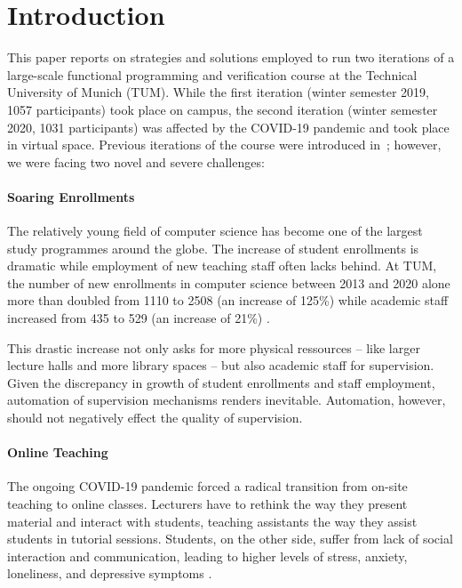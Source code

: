 \section{Introduction}

This paper reports on strategies and solutions employed to
run two iterations of a large-scale functional programming and verification course at the Technical University of Munich (TUM).
While the first iteration (winter semester 2019, 1057  participants)
took place on campus,
the second iteration (winter semester 2020, 1031 participants) was affected by the COVID-19 pandemic and took place in virtual space.
Previous iterations of the course were introduced in~\citep{next_1100};
however, we were facing two novel and severe challenges:

\paragraph{Soaring Enrollments}
The relatively young field of computer science has
become one of the largest study programmes around the globe.
The increase of student enrollments is dramatic
\citep{comp_sci_growth1,comp_sci_growth2}
while employment of new teaching staff often lacks behind.
At TUM, the number of new enrollments in computer science between 2013 and 2020 alone
more than doubled from 1110 to 2508 (an increase of 125\%)
while academic staff increased from 435 to 529 (an increase of 21\%) \citep{tum_numbers}.

This drastic increase not only asks for more physical ressources -- like larger lecture halls and more library spaces --
but also academic staff for supervision.
Given the discrepancy in growth of student enrollments and staff employment,
automation of supervision mechanisms renders inevitable.
Automation, however, should not
negatively effect the quality of supervision.

\paragraph{Online Teaching}
The ongoing COVID-19 pandemic forced a radical
transition from on-site teaching to online classes.
Lecturers have to rethink the way they present material and interact with students,
teaching assistants the way they assist students in tutorial sessions.
Students, on the other side, suffer from lack of social interaction and communication, leading to higher
levels of stress, anxiety, loneliness, and depressive symptoms \citep{students_lockdown1}.

